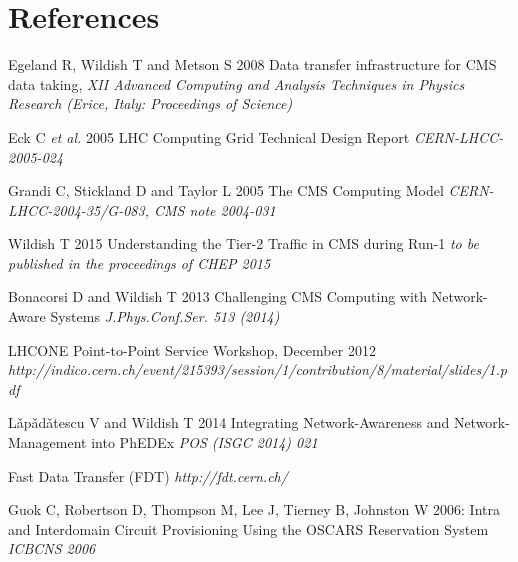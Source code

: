 \section*{References}

\begin{thebibliography}{1}

  Egeland R, Wildish T and Metson S 2008 Data transfer infrastructure for CMS data taking,  {\it XII Advanced Computing and Analysis Techniques in Physics Research (Erice, Italy: Proceedings of Science)}

 Eck C {\it et al.} 2005 LHC Computing Grid Technical Design Report {\it CERN-LHCC-2005-024}

  Grandi C, Stickland D and Taylor L 2005 The CMS Computing Model {\it CERN-LHCC-2004-35/G-083, CMS note 2004-031}

 Wildish T 2015 Understanding the Tier-2 Traffic in CMS during Run-1 {\it to be published in the proceedings of CHEP 2015}

 Bonacorsi D and Wildish T 2013 Challenging CMS Computing with Network-Aware Systems {\it J.Phys.Conf.Ser. 513 (2014)}

 LHCONE Point-to-Point Service Workshop, December 2012 
 {\it http://indico.cern.ch/event/215393/session/1/contribution/8/material/slides/1.pdf}

 L\v{a}p\v{a}d\v{a}tescu V and Wildish T 2014 Integrating Network-Awareness and Network-Management into PhEDEx {\it POS (ISGC 2014) 021}

 Fast Data Transfer (FDT) {\it http://fdt.cern.ch/}

  Guok C, Robertson D, Thompson M, Lee J, Tierney B, Johnston W 2006: Intra and Interdomain Circuit Provisioning Using the OSCARS Reservation System {\it ICBCNS 2006}

\end{thebibliography}